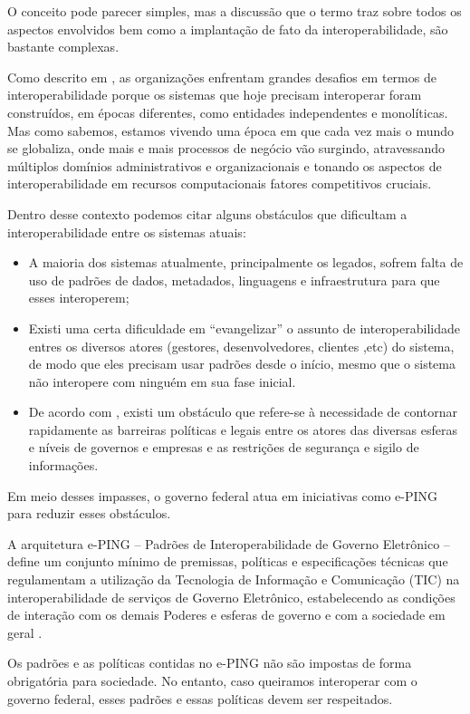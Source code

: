 O conceito pode parecer simples, mas a discussão que o termo traz sobre todos os aspectos envolvidos bem como a implantação de fato da interoperabilidade, são bastante complexas.

Como descrito em \cite{spb}, as organizações enfrentam grandes desafios em termos de interoperabilidade porque os sistemas que hoje precisam interoperar foram construídos, em épocas diferentes, como entidades independentes e monolíticas. Mas como sabemos, estamos vivendo uma época em que cada vez mais o mundo se globaliza, onde mais e mais processos de negócio vão surgindo, atravessando múltiplos domínios administrativos e organizacionais e tonando os aspectos de interoperabilidade em recursos computacionais fatores competitivos cruciais. 

Dentro desse contexto podemos citar alguns obstáculos que dificultam a interoperabilidade entre os sistemas atuais:

\begin{itemize}
\item A maioria dos sistemas atualmente, principalmente os legados, sofrem falta de uso de padrões de dados, metadados, linguagens e infraestrutura para que esses interoperem;
\item Existi uma certa dificuldade em “evangelizar” o assunto de interoperabilidade entres os diversos atores (gestores, desenvolvedores, clientes ,etc) do sistema, de modo que eles precisam usar padrões desde o início, mesmo que o sistema não interopere com ninguém em sua fase inicial.
\item De acordo com \cite{kamada}, existi um obstáculo que refere-se à necessidade de contornar rapidamente as barreiras políticas e legais entre os atores das diversas esferas e níveis de governos e empresas e as restrições de segurança e sigilo de informações.
\end{itemize}

Em meio desses impasses, o governo federal atua em iniciativas como e-PING para reduzir esses obstáculos.

A arquitetura e-PING – Padrões de Interoperabilidade de Governo Eletrônico – define um conjunto mínimo de premissas, políticas e especificações técnicas que regulamentam a utilização da Tecnologia de Informação e Comunicação (TIC) na interoperabilidade de serviços de Governo Eletrônico, estabelecendo as condições de interação com os demais Poderes e esferas de governo e com a sociedade em geral \cite{eping}.

Os padrões e as políticas contidas no e-PING não são impostas de forma obrigatória para sociedade. No entanto, caso queiramos interoperar com o governo federal, esses padrões e essas políticas devem ser respeitados. 

